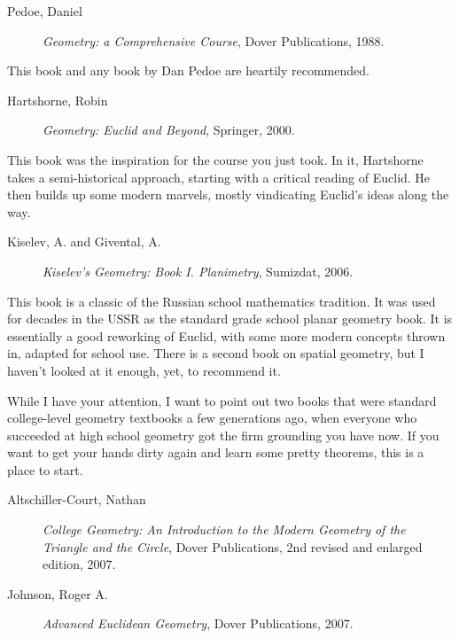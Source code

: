 \documentclass{tufte-handout}
\theoremstyle{definition}
\begin{document}
\begin{description}
\item[Pedoe, Daniel] \emph{Geometry: a Comprehensive Course}, Dover Publications, 1988. 
\end{description}

This book and any book by Dan Pedoe are heartily recommended.

\begin{description}
\item[Hartshorne, Robin] \emph{Geometry: Euclid and Beyond}, Springer, 2000. 
\end{description}

This book was the inspiration for the course you just took. In it, Hartshorne takes a semi-historical approach, starting with a critical reading of Euclid. He then builds up some modern marvels, mostly vindicating Euclid's ideas along the way.

\begin{description}
\item[Kiselev, A. and Givental, A.] \emph{Kiselev's Geometry: Book I. Planimetry}, Sumizdat, 2006. 
\end{description}

This book is a classic of the Russian school mathematics tradition. It was used for decades in the USSR as the standard grade school planar geometry book. 
It is essentially a good reworking of Euclid, with some more modern concepts thrown in, adapted for school use. 
There is a second book on spatial geometry, but I haven't looked at it enough, yet, to recommend it.

While I have your attention, I want to point out two books that were standard college-level geometry textbooks a few generations ago, when everyone who succeeded at high school geometry got the firm grounding you have now. If you want to get your hands dirty again and learn some pretty theorems, this is a place to start. 

\begin{description}
\item[Altschiller-Court, Nathan] \emph{College Geometry: An Introduction to the Modern Geometry of the Triangle and the Circle}, Dover Publications, 2nd revised and enlarged edition, 2007. 

\item[Johnson, Roger A.] \emph{Advanced Euclidean Geometry}, Dover Publications, 2007.

\end{description}
\end{document}
